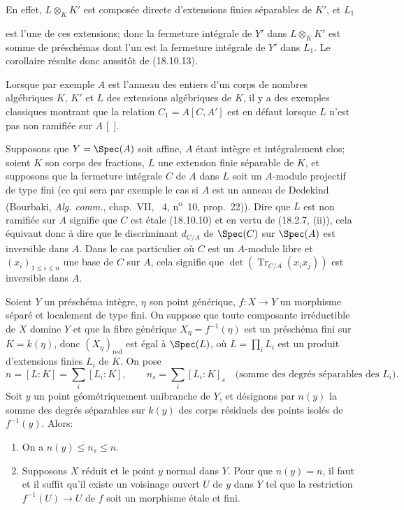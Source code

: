En effet, $L\otimes_K K'$ est composée directe d'extensions finies séparables de $K'$, et $L_1$


est l'une de ces extensions; donc la fermeture intégrale de $Y'$ dans $L\otimes_K K'$ est somme de préschémas dont l'un est la fermeture intégrale de $Y'$ dans $L_1$. Le corollaire résulte donc aussitôt de (18.10.13).

Lorsque par exemple $A$ est l'anneau des entiers d'un corps de nombres algébriques $K$, $K'$ et $L$ des extensions algébriques de $K$, il y a des exemples classiques montrant que la relation $C_1=A[C,A']$ est en défaut lorsque $L$ n'est pas non ramifiée sur $A$ [\ ].

\begin{env}[18.10.15]
\label{IV.18.10.15}
Supposons que $Y=\Spec(A)$ soit affine, $A$ étant intègre et intégralement clos; soient $K$ son corps des fractions, $L$ une extension finie séparable de $K$, et supposons que la fermeture intégrale $C$ de $A$ dans $L$ soit un $A$-module projectif de type fini (ce qui sera par exemple le cas si $A$ est un anneau de Dedekind (Bourbaki, \emph{Alg. comm.}, chap.~VII, \textsection~4, n\textsuperscript{o}~10, prop.~22)). Dire que $L$ est non ramifiée sur $A$ signifie que $C$ est étale (18.10.10) et en vertu de (18.2.7, (ii)), cela équivaut donc à dire que le discriminant $d_{C/A}$ de $\Spec(C)$ sur $\Spec(A)$ est inversible dans $A$. Dans le cas particulier où $C$ est un $A$-module libre et $(x_i)_{1\leq i\leq n}$ une base de $C$ sur $A$, cela signifie que $\det(\operatorname{Tr}_{C/A}(x_ix_j))$ est inversible dans $A$.
\end{env}

\begin{theorem}[18.10.16]
\label{IV.18.10.16}
Soient $Y$ un préschéma intègre, $\eta$ son point générique, $f:X\to Y$ un morphisme séparé et localement de type fini. On suppose que toute composante irréductible de $X$ domine $Y$ et que la fibre générique $X_\eta=f^{-1}(\eta)$ est un préschéma fini sur $K=k(\eta)$, donc $(X_\eta)_{\mathrm{red}}$ est égal à $\Spec(L)$, où $L=\prod_iL_i$ est un produit d'extensions finies $L_i$ de $K$. On pose
\[
  n=[L:K]=\sum_i[L_i:K],\qquad n_s=\sum_i[L_i:K]_s \quad\text{(somme des degrés séparables des $L_i$)}.
\]
Soit $y$ un point géométriquement unibranche de $Y$, et désignons par $n(y)$ la somme des degrés séparables sur $k(y)$ des corps résiduels des points isolés de $f^{-1}(y)$. Alors:
\begin{enumerate}
  \item[(i)] On a $n(y)\leq n_s\leq n$.
  \item[(ii)] Supposons $X$ réduit et le point $y$ normal dans $Y$. Pour que $n(y)=n$, il faut et il suffit qu'il existe un voisinage ouvert $U$ de $y$ dans $Y$ tel que la restriction $f^{-1}(U)\to U$ de $f$ soit un morphisme étale et fini.
\end{enumerate}
\end{theorem}

